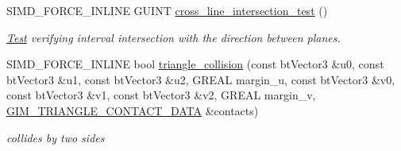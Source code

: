 \begin{DoxyCompactItemize}
\item 
S\+I\+M\+D\+\_\+\+F\+O\+R\+C\+E\+\_\+\+I\+N\+L\+I\+N\+E G\+U\+I\+N\+T \hyperlink{class_g_i_m___t_r_i_a_n_g_l_e___c_a_l_c_u_l_a_t_i_o_n___c_a_c_h_e_a8ce209ccff8cdd7ece72b0465e222a85}{cross\+\_\+line\+\_\+intersection\+\_\+test} ()
\begin{DoxyCompactList}\small\item\em \hyperlink{class_test}{Test} verifying interval intersection with the direction between planes. \end{DoxyCompactList}\item 
\hypertarget{class_g_i_m___t_r_i_a_n_g_l_e___c_a_l_c_u_l_a_t_i_o_n___c_a_c_h_e_ae9c1727c7a906900043eab45b25cbf50}{S\+I\+M\+D\+\_\+\+F\+O\+R\+C\+E\+\_\+\+I\+N\+L\+I\+N\+E bool \hyperlink{class_g_i_m___t_r_i_a_n_g_l_e___c_a_l_c_u_l_a_t_i_o_n___c_a_c_h_e_ae9c1727c7a906900043eab45b25cbf50}{triangle\+\_\+collision} (const bt\+Vector3 \&u0, const bt\+Vector3 \&u1, const bt\+Vector3 \&u2, G\+R\+E\+A\+L margin\+\_\+u, const bt\+Vector3 \&v0, const bt\+Vector3 \&v1, const bt\+Vector3 \&v2, G\+R\+E\+A\+L margin\+\_\+v, \hyperlink{struct_g_i_m___t_r_i_a_n_g_l_e___c_o_n_t_a_c_t___d_a_t_a}{G\+I\+M\+\_\+\+T\+R\+I\+A\+N\+G\+L\+E\+\_\+\+C\+O\+N\+T\+A\+C\+T\+\_\+\+D\+A\+T\+A} \&contacts)}\label{class_g_i_m___t_r_i_a_n_g_l_e___c_a_l_c_u_l_a_t_i_o_n___c_a_c_h_e_ae9c1727c7a906900043eab45b25cbf50}

\begin{DoxyCompactList}\small\item\em collides by two sides \end{DoxyCompactList}\end{DoxyCompactItemize}
